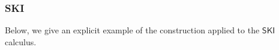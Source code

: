 \documentclass{llncs}
\renewcommand{\:}{\colon}
\begin{document}
\subsubsection{SKI}
Below, we give an explicit example of the construction applied to the $\mathsf{SKI}$ calculus.











\end{document}
